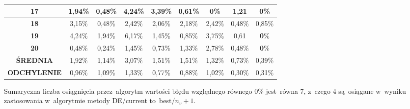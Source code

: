 \begin{itemize}
\begin{table}[h!]
\begin{center}
{\begin{tabular}{|c|c|c|c|c|c|c|c|c|}
\textbf{17}&1,94\%&0,48\%&4,24\%&3,39\%&0,61\%&\color{green}\textbf{0}\%&1,21&\color{green}\textbf{0}\% \\ \hline
\textbf{18}&3,15\%&0,48\%&2,42\%&2,06\%&2,18\%&2,42\%&0,48\%&0,85\% \\ \hline
\textbf{19}&4,24\%&1,94\%&6,17\%&1,45\%&0,85\%&3,75\%&0,61&\color{green}\textbf{0}\% \\ \hline
\textbf{20}&0,48\%&0,24\%&1,45\%&0,73\%&1,33\%&2,78\%&0,48\%&\color{green}\textbf{0}\% \\ \hline
\textbf{ŚREDNIA}&1,92\%&1,14\%&3,07\%&1,51\%&1,51\%&1,32\%&0,73\%&0,39\% \\ \hline
\textbf{ODCHYLENIE}&0,96\%&1,09\%&1,33\%&0,77\%&0,88\%&1,02\%&0,30\%&0,31\% \\ \hline
\end{tabular}}
\label{losowa20}
\end{center}
\end{table}

Sumaryczna liczba osiągnięcia przez~algorytm wartości błędu względnego równego 0\% jest~równa 7, z~czego 4 są~osiągane w~wyniku zastosowania w~algorytmie metody DE/current to~best/$n_{v}+1$.

\begin{table}[h!]
\begin{center}
\caption{Ranking metod mutacji na podstawie średniej wartości błędu względnego funkcji celu, metoda losowa, 20 000 iteracji.}
\label{ranking5}
\end{center}
\end{table}


\end{itemize}
